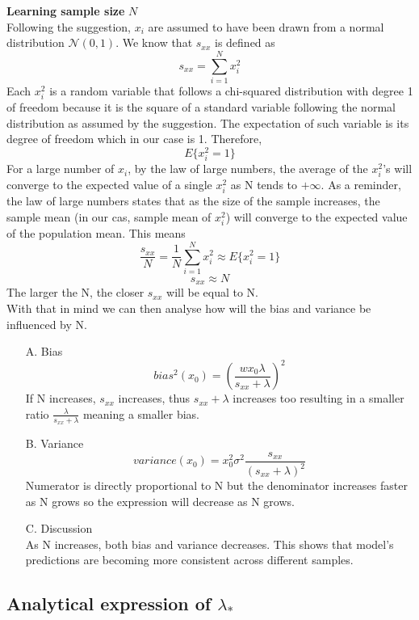 \documentclass[12pt,titlepage]{article}
\begin{document}
\begin{enumerate}[a.]
    \textbf{Learning sample size} $N$ \\
    Following the suggestion, $x_{i}$ are assumed to have been drawn from a normal distribution $\mathcal{N}(0,1)$. We know that $s_{xx}$ is defined as 
    $$ s_{xx} = \sum_{i=1}^{N} x_{i}^{2}$$
    Each $x_{i}^{2}$ is a random variable that follows a chi-squared distribution with degree 1 of freedom because it is the square of a standard variable following the normal distribution as assumed by the suggestion. The expectation of such variable is its degree of freedom which in our case is 1. Therefore, $$ E\{ x_{i}^{2} = 1 \} $$
    For a large number of $x_{i}$, by the law of large numbers, the average of the $x_{i}^{2}$'s will converge to the expected value of a single $x_{i}^{2}$ as N tends to $+\infty$. As a reminder, the law of large numbers states that as the size of the sample increases, the sample mean (in our cas, sample mean of $x_{i}^{2}$) will converge to the expected value of the population mean. This means 
    $$ \frac{s_{xx}}{N} = \frac{1}{N} \sum_{i=1}^{N}x_{i}^{2} \approx E\{ x_{i}^{2} = 1 \}$$
    $$ s_{xx} \approx N $$
    The larger the N, the closer $s_{xx}$ will be equal to N. \\
    With that in mind we can then analyse how will the bias and variance be influenced by N. \\
    \begin{itemize}
        \item[A.] Bias \\
        $$ bias^{2}(x_{0}) =\left(\frac{w x_{0} \lambda}{s_{xx} + \lambda}\right)^{2} $$
        If N increases, $s_{xx}$ increases, thus $s_{xx} + \lambda$ increases too resulting in a smaller ratio $\frac{\lambda}{s_{xx} + \lambda}$ meaning a smaller bias.
        \item[B.] Variance \\
        $$variance(x_{0}) = x_{0}^{2} \sigma^{2} \frac{s_{xx}}{(s_{xx} + \lambda)^{2}}$$
        Numerator is directly proportional to N but the denominator increases faster as N grows so the expression will decrease as N grows.
        \item[C.] Discussion \\
        As N increases, both bias and variance decreases. This shows that model's predictions are becoming more consistent across different samples.
    \end{itemize}
\end{enumerate}

\subsection{Analytical expression of $\lambda_*$}
\end{document}

